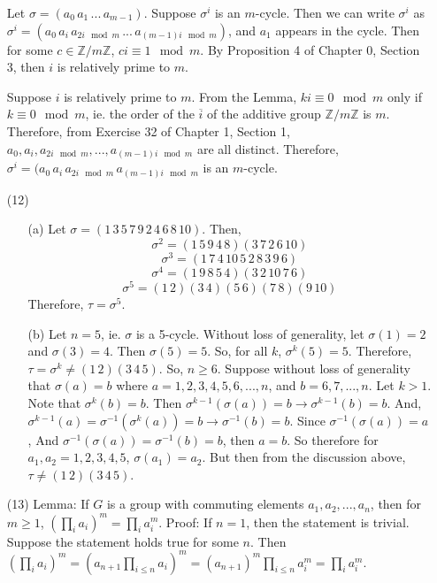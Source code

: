 \documentclass[12pt]{article}
\begin{document}
\begin{itemize}
Let $\sigma = (a_0 \, a_1 \, ... \, a_{m - 1})$. Suppose $\sigma^i$ is an $m$-cycle. Then we can write $\sigma^i$ as $\sigma^i = (a_0 \, a_{i} \, a_{2i \mod m} \, ... \, a_{(m - 1)i \mod m})$, and $a_1$ appears in the cycle. Then for some $c \in \mathbb{Z}/m\mathbb{Z}$, $ci \equiv 1 \mod m$. By Proposition 4 of Chapter 0, Section 3, then $i$ is relatively prime to $m$.

Suppose $i$ is relatively prime to $m$. From the Lemma, $ki \equiv 0 \mod m$ only if $k \equiv 0 \mod m$, ie. the order of the $\overline{i}$ of the additive group $\mathbb{Z}/m\mathbb{Z}$ is $m$. Therefore, from Exercise 32 of Chapter 1, Section 1, $a_0, a_i, a_{2i \mod m}, ..., a_{(m - 1)i \mod m}$ are all distinct. Therefore, \\ $\sigma^i = (a_0 \, a_i \, a_{2i \mod m} \, a_{(m - 1)i \mod m}$ is an $m$-cycle.
\item[(12)]
\begin{itemize}
\item[(a)]
Let $\sigma = (1 \, 3 \, 5 \, 7 \, 9 \, 2 \, 4 \, 6 \, 8 \, 10)$. Then,
$$\sigma^2 = (1 \, 5 \, 9 \, 4 \, 8)(3 \, 7 \, 2 \, 6 \, 10)$$
$$\sigma^3 = (1 \, 7 \, 4 \, 10 \, 5 \, 2 \, 8 \, 3 \, 9 \, 6)$$
$$\sigma^4 = (1 \, 9 \, 8 \, 5 \, 4)(3 \, 2 \, 10 \, 7 \, 6)$$
$$\sigma^5 = (1 \, 2)(3 \, 4)(5 \, 6)(7 \, 8)(9 \, 10)$$
Therefore, $\tau = \sigma^5$.
\item[(b)]
Let $n = 5$, ie. $\sigma$ is a 5-cycle. Without loss of generality, let $\sigma(1) = 2$ and $\sigma(3) = 4$. Then $\sigma(5) = 5$. So, for all $k$, $\sigma^k(5) = 5$. Therefore, $\tau = \sigma^k \neq (1 \, 2)(3 \, 4 \, 5)$. So, $n \geq 6$. Suppose without loss of generality that $\sigma(a) = b$ where $a = 1,2,3,4,5,6,...,n$, and $b = 6,7,...,n$. Let $k > 1$. Note that $\sigma^k(b) = b$. Then $\sigma^{k-1}(\sigma(a)) = b \rightarrow \sigma^{k-1}(b) = b$. And, $\sigma^{k-1}(a) = \sigma^{-1}(\sigma^k(a)) = b \rightarrow \sigma^{-1}(b) = b$. Since $\sigma^{-1}(\sigma(a)) = a$, And $\sigma^{-1}(\sigma(a)) = \sigma^{-1}(b) = b$, then $a = b$. So therefore for $a_1, a_2 = 1,2,3,4,5$, $\sigma(a_1) = a_2$. But then from the discussion above, $\tau \neq (1 \, 2)(3 \, 4 \, 5)$.
\end{itemize}
\item[(13)]
Lemma: If $G$ is a group with commuting elements $a_1, a_2, ..., a_n$, then for $m \geq 1$, $(\prod_i a_i)^m = \prod_i a_i^m$. Proof: If $n = 1$, then the statement is trivial. Suppose the statement holds true for some $n$. Then  $(\prod_i a_i)^m = (a_{n+1}\prod_{i \leq n} a_i)^m = (a_{n+1})^m\prod_{i \leq n}a_i^m = \prod_i a_i^m$.


\end{itemize}
\end{document}
